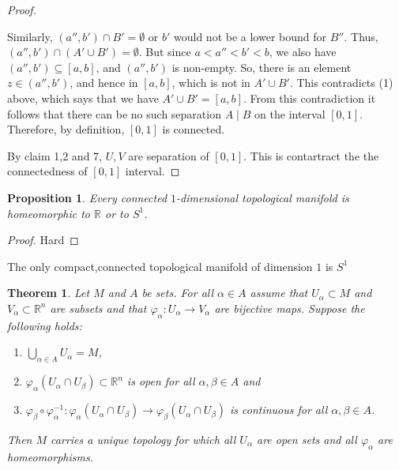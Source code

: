\documentclass[
]{book}
\newtheorem{theorem}{Theorem}[chapter]
\newtheorem{proposition}{Proposition}[chapter]
\theoremstyle{definition}
\theoremstyle{definition}
\theoremstyle{definition}
\theoremstyle{definition}
\theoremstyle{remark}
\begin{document}
\begin{proof}
\begin{itemize}
  Similarly, \((a'',b') \cap B' = \emptyset\) or \(b'\) would not be a lower bound for \(B''\).
  Thus, \((a'',b') \cap (A' \cup B') = \emptyset\).
  But since \(a < a'' < b' < b\), we also have \((a'',b') \subseteq [a,b]\), and \((a'',b')\) is non-empty.
  So, there is an element \(z \in (a'',b')\), and hence in \([a,b]\), which is not in \(A' \cup B'\).
  This contradicts (1) above, which says that we have \(A' \cup B' = [a,b]\).
  From this contradiction it follows that there can be no such separation \(A \mid B\) on the interval \([0,1]\).
  Therefore, by definition, \([0,1]\) is connected.
\end{itemize}

By claim 1,2 and 7, \(U,V\) are separation of \([0,1]\). This is contartract the the connectedness of \([0,1]\) interval.
\end{proof}

\begin{proposition}
\protect\hypertarget{prp:unnamed-chunk-18}{}\label{prp:unnamed-chunk-18}Every connected \(1\)-dimensional topological manifold is homeomorphic to \(\mathbb{R}\) or to \(S^1\).
\end{proposition}

\begin{proof}
Hard
\end{proof}

The only compact,connected topological manifold of dimension \(1\) is \(S^1\)

\begin{theorem}
\protect\hypertarget{thm:unnamed-chunk-20}{}\label{thm:unnamed-chunk-20}Let \(M\) and \(A\) be sets. For all \(\alpha \in A\) assume that \(U_\alpha \subset M\) and \(V_\alpha \subset \mathbb{R}^n\) are subsets and that \(\varphi_\alpha : U_\alpha \rightarrow V_\alpha\) are bijective maps. Suppose the following holds:

\begin{enumerate}
\def\labelenumi{(\roman{enumi})}
\item
  \(\bigcup_{\alpha \in A} U_\alpha = M\),
\item
  \(\varphi_\alpha(U_\alpha \cap U_\beta) \subset \mathbb{R}^n\) is open for all \(\alpha, \beta \in A\) and
\item
  \(\varphi_\beta \circ \varphi_\alpha^{-1} : \varphi_\alpha(U_\alpha \cap U_\beta) \rightarrow \varphi_\beta(U_\alpha \cap U_\beta)\) is continuous for all \(\alpha, \beta \in A\).
\end{enumerate}

Then \(M\) carries a unique topology for which all \(U_\alpha\) are open sets and all \(\varphi_\alpha\) are homeomorphisms.
\end{theorem}
\end{document}
